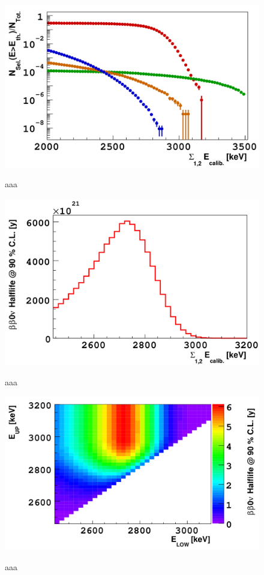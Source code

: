 \documentclass[main.tex]{subfiles}
\begin{document}
\begin{figure}[h!]
\centering
\includegraphics[scale=0.3]{pictures/Chap4/SelectionEfficiency.png}
\label{SelectionEfficiency.png}
\caption{aaa}
\end{figure}


\begin{figure}[h!]
\centering
\includegraphics[scale=0.3]{pictures/Chap4/Sens0nu1D.png}
\label{Sens0nu1D.png}
\caption{aaa}
\end{figure}


\begin{figure}[h!]
\centering
\includegraphics[scale=0.3]{pictures/Chap4/Sens0nu2D.png}
\label{Sens0nu2D.png}
\caption{aaa}
\end{figure}
\end{document}
